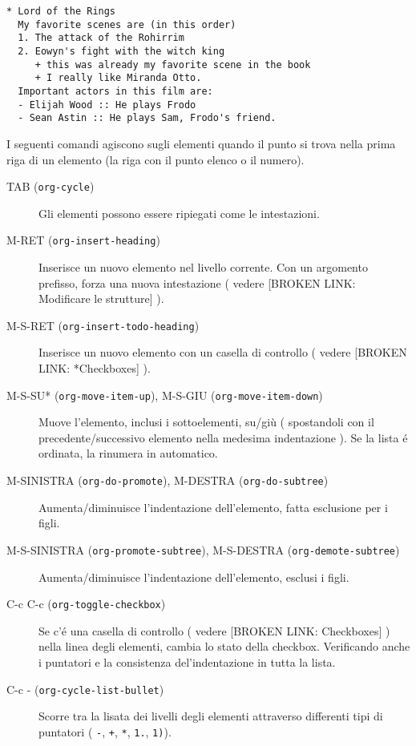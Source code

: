 \documentclass[11pt]{article}
\begin{document}
\begin{verbatim}
* Lord of the Rings
  My favorite scenes are (in this order)
  1. The attack of the Rohirrim
  2. Eowyn's fight with the witch king
     + this was already my favorite scene in the book
     + I really like Miranda Otto.
  Important actors in this film are:
  - Elijah Wood :: He plays Frodo
  - Sean Astin :: He plays Sam, Frodo's friend.
\end{verbatim}

I seguenti comandi agiscono sugli elementi quando il punto si trova
nella prima riga di un elemento (la riga con il punto elenco o il
numero).

\begin{description}
\item[{TAB (\texttt{org-cycle})}] Gli elementi possono essere ripiegati come le intestazioni.

\item[{M-RET (\texttt{org-insert-heading})}] Inserisce un nuovo elemento nel livello corrente. Con un argomento
prefisso, forza una nuova intestazione ( vedere [BROKEN LINK: Modificare le strutture] ).

\item[{M-S-RET (\texttt{org-insert-todo-heading})}] Inserisce un nuovo elemento con un casella di controllo ( vedere
[BROKEN LINK: *Checkboxes] ).

\item[{M-S-SU* (\texttt{org-move-item-up}), M-S-GIU (\texttt{org-move-item-down})}] Muove l'elemento, inclusi i sottoelementi, su/giù ( spostandoli con
il precedente/successivo elemento nella medesima indentazione ). Se
la lista é ordinata, la rinumera in automatico.

\item[{M-SINISTRA (\texttt{org-do-promote}), M-DESTRA (\texttt{org-do-subtree})}] Aumenta/diminuisce l'indentazione dell'elemento, fatta esclusione
per i figli.

\item[{M-S-SINISTRA (\texttt{org-promote-subtree}), M-S-DESTRA (\texttt{org-demote-subtree})}] Aumenta/diminuisce l'indentazione dell'elemento, esclusi i figli.

\item[{C-c C-c (\texttt{org-toggle-checkbox})}] Se c'é una casella di controllo ( vedere [BROKEN LINK: Checkboxes] ) nella linea
degli elementi, cambia lo stato della checkbox. Verificando anche i
puntatori e la consistenza del'indentazione in tutta la lista.

\item[{C-c - (\texttt{org-cycle-list-bullet})}] Scorre tra la lisata dei livelli degli elementi attraverso
differenti tipi di puntatori ( \texttt{-}, \texttt{+}, \texttt{*}, \texttt{1.}, \texttt{1)}).
\end{description}
\end{document}
